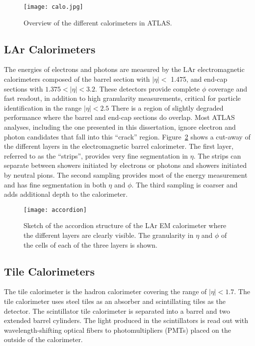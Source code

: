 \begin{figure}[htb!]
\centering
\texttt{[image: calo.jpg]}
\caption{Overview of the different calorimeters in ATLAS.}%
\label{fig:exp.atlas.calo}
\end{figure} 


\subsection*{LAr Calorimeters}

The energies of electrons and photons are measured by the LAr electromagnetic calorimeters composed of 
the barrel section with $|\eta| <$ 1.475, and end-cap sections with $1.375 < |\eta| < 3.2$.
These detectors provide complete $\phi$ coverage and fast readout, in addition to 
high granularity measurements, critical for particle identification in the range $|\eta|<2.5$
There is a region of slightly degraded performance where the barrel and end-cap sections 
do overlap. Most ATLAS analyses, including the one presented in this dissertation, ignore
electron and photon candidates that fall into this ``crack'' region.
Figure~\ref{fig:exp.atlas.accordion}
shows a cut-away of the different layers in the electromagnetic barrel calorimeter. The first layer, referred to as
the ``strips'', provides very fine segmentation in $\eta$. The strips can separate between showers initiated
by electrons or photons and showers initiated by neutral pions. The second sampling provides most
of the energy measurement and has fine segmentation in both $\eta$ and $\phi$. The third sampling is coarser
and adds additional depth to the calorimeter.



\begin{figure}[htb!]
\centering
\texttt{[image: accordion]}
\caption{Sketch of the accordion structure of the LAr EM calorimeter
where the different layers are clearly visible. 
The granularity in $\eta$ and $\phi$ of the cells of each of the three layers is shown.}%
\label{fig:exp.atlas.accordion}
\end{figure} 


\subsection*{Tile Calorimeters}

The tile calorimeter is the hadron calorimeter covering the range of $|\eta| < 1.7$.
The tile calorimeter uses steel tiles as an absorber and scintillating tiles as the detector.
The scintillator tile calorimeter is separated into a barrel and two extended barrel cylinders.
The light produced in the scintillators is read out with wavelength-shifting optical fibers to photomultipliers (PMTs) placed on the outside of the calorimeter. 



